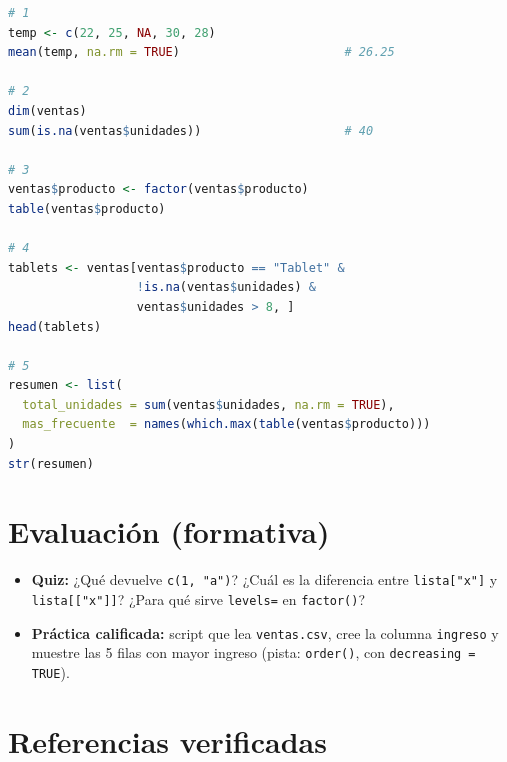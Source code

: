 \begin{lstlisting}[language=R]
# 1
temp <- c(22, 25, NA, 30, 28)
mean(temp, na.rm = TRUE)                       # 26.25

# 2
dim(ventas)
sum(is.na(ventas$unidades))                    # 40

# 3
ventas$producto <- factor(ventas$producto)
table(ventas$producto)

# 4
tablets <- ventas[ventas$producto == "Tablet" &
                  !is.na(ventas$unidades) &
                  ventas$unidades > 8, ]
head(tablets)

# 5
resumen <- list(
  total_unidades = sum(ventas$unidades, na.rm = TRUE),
  mas_frecuente  = names(which.max(table(ventas$producto)))
)
str(resumen)
\end{lstlisting}

\section{Evaluación (formativa)}

\begin{itemize}
\tightlist
\item
  \textbf{Quiz:} ¿Qué devuelve \passthrough{\lstinline!c(1, "a")!}?
  ¿Cuál es la diferencia entre \passthrough{\lstinline!lista["x"]!} y
  \passthrough{\lstinline!lista[["x"]]!}? ¿Para qué sirve
  \passthrough{\lstinline!levels=!} en
  \passthrough{\lstinline!factor()!}?
\item
  \textbf{Práctica calificada:} script que lea
  \passthrough{\lstinline!ventas.csv!}, cree la columna
  \passthrough{\lstinline!ingreso!} y muestre las 5 filas con mayor
  ingreso (pista: \passthrough{\lstinline!order()!}, con
  \passthrough{\lstinline!decreasing = TRUE!}).
\end{itemize}

\section{Referencias verificadas}

